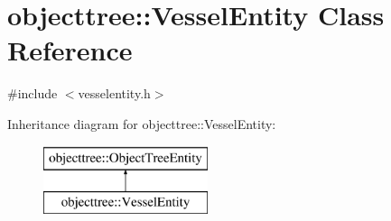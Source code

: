 \hypertarget{classobjecttree_1_1_vessel_entity}{}\section{objecttree\+::Vessel\+Entity Class Reference}
\label{classobjecttree_1_1_vessel_entity}


{\ttfamily \#include $<$vesselentity.\+h$>$}

Inheritance diagram for objecttree\+::Vessel\+Entity\+:\begin{figure}[H]
\begin{center}
\leavevmode
\includegraphics[height=2.000000cm]{d4/dcb/classobjecttree_1_1_vessel_entity}
\end{center}
\end{figure}
